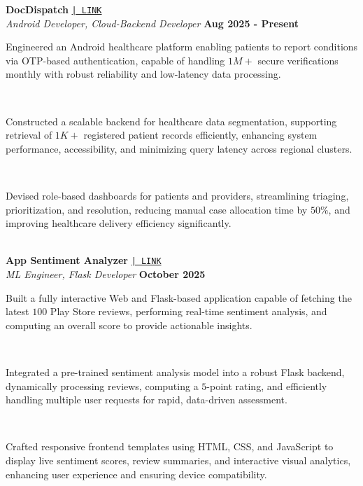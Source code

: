 \documentclass[a4paper,10pt]{article}
\begin{document}
\noindent
\textbf{DocDispatch}
\href{https://github.com/yashpreeto7/DocDispatch}{\texttt{| LINK}} \\
\textit{Android Developer, Cloud-Backend Developer} \hfill \textbf{Aug 2025 - Present} \\[-8pt]

\noindent\makebox[1.5em][l]{--}%
\parbox[t]{\dimexpr\linewidth-1.5em\relax}{%
Engineered an Android healthcare platform enabling patients to report conditions via OTP-based authentication, capable of handling $1M+$ secure verifications monthly with robust reliability and low-latency data processing.} \\[0pt]

\noindent\makebox[1.5em][l]{--}%
\parbox[t]{\dimexpr\linewidth-1.5em\relax}{%
Constructed a scalable backend for healthcare data segmentation, supporting retrieval of $1K+$ registered patient records efficiently, enhancing system performance, accessibility, and minimizing query latency across regional clusters.} \\[0pt]

\noindent\makebox[1.5em][l]{--}%
\parbox[t]{\dimexpr\linewidth-1.5em\relax}{%
Devised role-based dashboards for patients and providers, streamlining triaging, prioritization, and resolution, reducing manual case allocation time by $50\%$, and improving healthcare delivery efficiency significantly.} \\[4pt]

\noindent
\textbf{App Sentiment Analyzer} 
\href{https://github.com/ppriyanshu26/SentimentAnalyzer}{\texttt{| LINK}} \\
\textit{ML Engineer, Flask Developer} \hfill \textbf{October 2025} \\[-8pt]

\noindent\makebox[1.5em][l]{--}%
\parbox[t]{\dimexpr\linewidth-1.5em\relax}{%
Built a fully interactive Web and Flask-based application capable of fetching the latest $100$ Play Store reviews, performing real-time sentiment analysis, and computing an overall score to provide actionable insights.} \\[-2pt]

\noindent\makebox[1.5em][l]{--}%
\parbox[t]{\dimexpr\linewidth-1.5em\relax}{%
Integrated a pre-trained sentiment analysis model into a robust Flask backend, dynamically processing reviews, computing a $5$-point rating, and efficiently handling multiple user requests for rapid, data-driven assessment.} \\[-2pt]

\noindent\makebox[1.5em][l]{--}%
\parbox[t]{\dimexpr\linewidth-1.5em\relax}{%
Crafted responsive frontend templates using HTML, CSS, and JavaScript to display live sentiment scores, review summaries, and interactive visual analytics, enhancing user experience and ensuring device compatibility.} \\[4pt]
\end{document}
